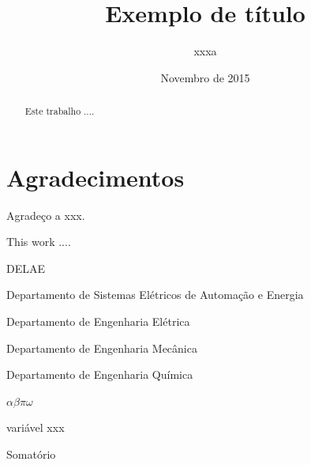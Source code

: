 \documentclass{automatextcc}
\begin{document}
\title{Exemplo de título}
\author{xxxa}
\dept{\DELAE}
\date{Novembro de 2015}
\maketitle
\chapter*{Agradecimentos}
Agradeço a xxx.
\begin{abstract}
Este trabalho ....
\end{abstract}
\begin{englishabstract}
This work ....
\end{englishabstract}
\tableofcontents
\listoffigures
\listoftables
\begin{listofabbrv}{DELAE}
        \item[DELAE] Departamento de Sistemas Elétricos de Automação e Energia
        \item[DELET] Departamento de Engenharia Elétrica
        \item[DEMEC] Departamento de Engenharia Mecânica
        \item[DEQUI] Departamento de Engenharia Química
\end{listofabbrv}
\begin{listofsymbols}{$\alpha\beta\pi\omega$}
       \item[$\alpha\beta\pi\omega$] variável xxx
       \item[$\sum$] Somatório
\end{listofsymbols}
\end{document}
